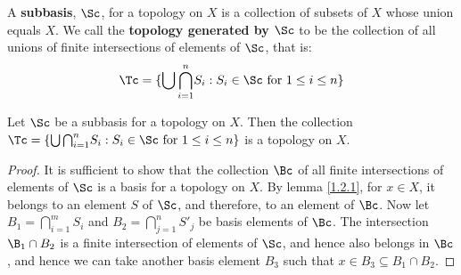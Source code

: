 \begin{definition}
    A \textbf{subbasis}, $\Sc$, for a topology on  $X$ is a collection of subsets of $X$ whose
    union equals $X$. We call the \textbf{topology generated by $\Sc$} to be the collection
    of all unions of finite intersections of elements of $\Sc$, that is:
        \begin{equation*}
            \Tc=\{\bigcup{\bigcap_{i=1}^{n}}{S_i}: S_i \in \Sc \text{ for } 1 \leq i \leq n\}
        \end{equation*}
\end{definition}

\begin{theorem}\label{1.2.5}
    Let $\Sc$ be a subbasis for a topology on  $X$. Then the collection $\Tc=\{\bigcup{\bigcap_{i=1}^{n}}{S_i}:
    S_i \in \Sc \text{ for } 1 \leq i \leq n\}$ is a topology on $X$.
\end{theorem}
\begin{proof}
    It is sufficient to show that the collection $\Bc$ of all finite intersections of elements
    of $\Sc$ is a basis for a topology on  $X$. By lemma \ref{1.2.1}, for $x \in X$, it belongs to
    an element  $S$ of  $\Sc$, and therefore, to an element of  $\Bc$. Now let  $B_1=\bigcap_{i=1}^m{S_i}$
    and $B_2=\bigcap_{j=1}^{n}{S'_j}$ be basis elements of $\Bc$. The intersection  $\B_1 \cap B_2$ is a
    finite intersection of elements of $\Sc$, and hence also belongs in  $\Bc$, and hence we can take
    another basis element  $B_3$ such that $x \in B_3 \subseteq B_1 \cap B_2$.
\end{proof}
